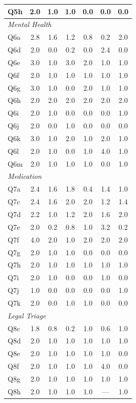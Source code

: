 \begin{table}[htbp]
\begin{tabular}{l|cccccc}
Q5h & 2.0 & 1.0 & 1.0 & 0.0 & 0.0 & 0.0 \\
\midrule
\multicolumn{7}{l}{\textit{Mental Health}} \\
Q6a & 2.8 & 1.6 & 1.2 & 0.8 & 0.2 & 2.0 \\
Q6d & 2.0 & 0.0 & 0.2 & 0.0 & 2.4 & 0.0 \\
Q6e & 3.0 & 1.0 & 3.0 & 2.0 & 1.0 & 1.0 \\
Q6f & 2.0 & 1.0 & 1.0 & 1.0 & 1.0 & 1.0 \\
Q6g & 3.0 & 1.0 & 0.0 & 2.0 & 1.0 & 1.0 \\
Q6h & 2.0 & 2.0 & 2.0 & 2.0 & 2.0 & 2.0 \\
Q6i & 2.0 & 1.0 & 0.0 & 0.0 & 0.0 & 1.0 \\
Q6j & 2.0 & 0.0 & 1.0 & 0.0 & 0.0 & 0.0 \\
Q6k & 3.0 & 1.0 & 2.0 & 1.0 & 2.0 & 1.0 \\
Q6l & 2.0 & 1.0 & 0.0 & 1.0 & 4.0 & 1.0 \\
Q6m & 2.0 & 1.0 & 1.0 & 1.0 & 0.0 & 1.0 \\
\midrule
\multicolumn{7}{l}{\textit{Medication}} \\
Q7a & 2.4 & 1.6 & 1.8 & 0.4 & 1.4 & 1.0 \\
Q7c & 2.4 & 1.6 & 2.0 & 2.0 & 1.2 & 1.4 \\
Q7d & 2.2 & 1.0 & 1.2 & 2.0 & 1.6 & 2.0 \\
Q7e & 2.0 & 0.2 & 0.8 & 1.0 & 3.2 & 0.2 \\
Q7f & 4.0 & 2.0 & 1.0 & 2.0 & 2.0 & 2.0 \\
Q7g & 2.0 & 1.0 & 1.0 & 0.0 & 0.0 & 0.0 \\
Q7h & 2.0 & 1.0 & 1.0 & 1.0 & 1.0 & 1.0 \\
Q7i & 2.0 & 1.0 & 0.0 & 0.0 & 1.0 & 0.0 \\
Q7j & 1.0 & 0.0 & 0.0 & 0.0 & 0.0 & 1.0 \\
Q7k & 2.0 & 0.0 & 1.0 & 1.0 & 0.0 & 0.0 \\
\midrule
\multicolumn{7}{l}{\textit{Legal Triage}} \\
Q8c & 1.8 & 0.8 & 0.2 & 1.0 & 0.6 & 1.0 \\
Q8d & 2.0 & 1.0 & 1.0 & 1.0 & 1.0 & 1.0 \\
Q8e & 2.0 & 1.0 & 1.0 & 1.0 & 1.0 & 0.0 \\
Q8f & 2.0 & 1.0 & 1.0 & 1.0 & 4.0 & 0.0 \\
Q8g & 2.0 & 1.0 & 1.0 & 1.0 & 1.0 & 1.0 \\
Q8h & 2.0 & 1.0 & 1.0 & 1.0 & --- & 1.0 \\

\end{tabular}
\end{table}
